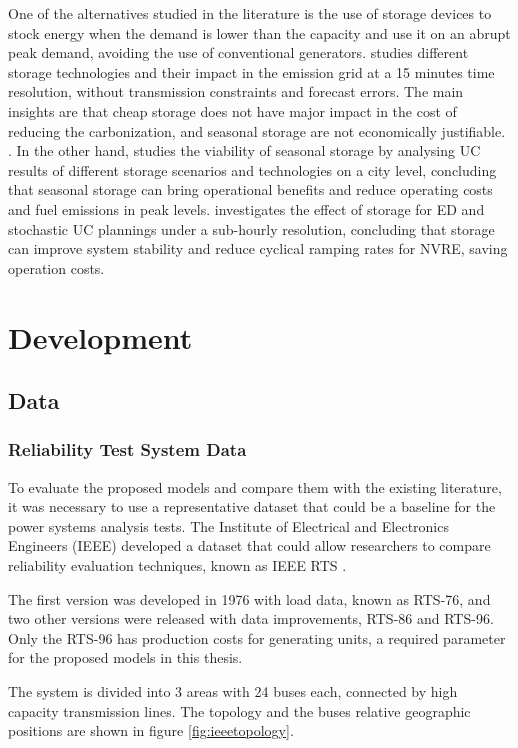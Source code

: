 \documentclass[12pt,LUDisStyle,twosided]{book}
\begin{document}
One of the alternatives studied in the literature is the use of storage devices to stock energy when the demand is lower than the capacity and use it on an abrupt peak demand, avoiding the use of conventional generators.  \citeauthor{safaei} \cite{safaei} studies different storage technologies and their impact in the emission grid at a 15 minutes time resolution, without transmission constraints and forecast errors. The main insights are that cheap storage does not have major impact in the cost of reducing the carbonization, and seasonal storage are not economically justifiable. . In the other hand, \citeauthor{harris} \cite{harris} studies the viability of seasonal storage by analysing UC results of different storage scenarios and technologies on a city level, concluding that seasonal storage can bring operational benefits and reduce operating costs and fuel emissions in peak levels. \citeauthor{dwyer} \cite{dwyer} investigates the effect of storage for ED and stochastic UC plannings under a sub-hourly resolution, concluding that storage can improve system stability and reduce cyclical ramping rates for NVRE, saving operation costs. 

\chapter{Development}
\section{Data}

\subsection{Reliability Test System Data}

To evaluate the proposed models and compare them with the existing literature, it was necessary to use a representative dataset that could be a baseline for the power systems analysis tests. The Institute of Electrical and Electronics Engineers (IEEE) developed a dataset that could allow researchers to compare reliability evaluation techniques, known as IEEE RTS \cite{wongieee}. 

The first version was developed in 1976 with load data, known as RTS-76, and two other versions were released with data improvements, RTS-86 and RTS-96. Only the RTS-96 has production costs for generating units, a required parameter for the proposed models in this thesis.

The system is divided into 3 areas with 24 buses each, connected by high capacity transmission lines. The topology and the buses relative geographic positions are shown in figure \ref{fig:ieeetopology}.
\end{document}
